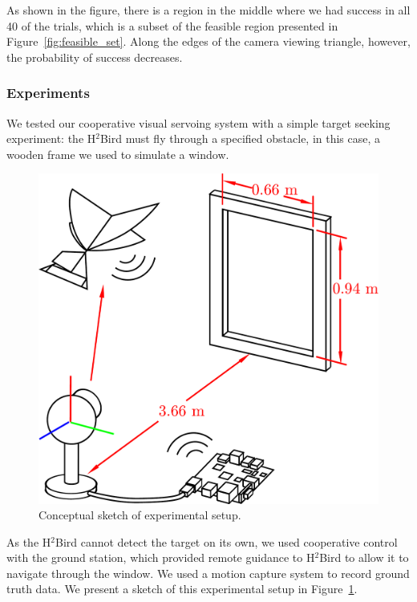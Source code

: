 \documentclass{aamas2013}
\begin{document}
As shown in the figure, there is a region in the middle where we had success
in all 40 of the trials, which is a subset of the feasible region presented in
Figure~\ref{fig:feasible_set}. Along the edges of the camera viewing triangle,
however, the probability of success decreases.

\subsubsection{Experiments}
\label{sec:experiments_verification}

We tested our cooperative visual servoing system with a simple target seeking
experiment: the H$^2$Bird must fly through a specified obstacle, in this 
case, a wooden frame we used to simulate a window.

\begin{figure}[tb]
\centering
\includegraphics[width=\linewidth]{figures/experiment_cartoon.pdf}
\caption{Conceptual sketch of experimental setup.}
\label{fig:experiment_cartoon}
\end{figure}

As the H$^2$Bird cannot detect the target on its own, we used cooperative 
control with the ground station, which provided remote guidance to 
H$^2$Bird to allow it to navigate through the window. We used a motion capture 
system to record ground truth data. We present a sketch of this experimental 
setup in Figure~\ref{fig:experiment_cartoon}.
\end{document}
